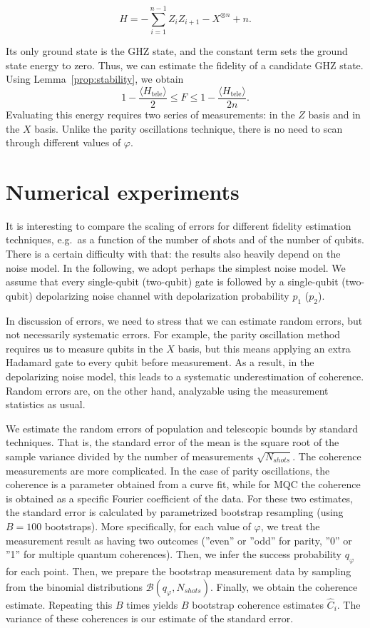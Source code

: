 \begin{equation}
    H = -\sum_{i=1}^{n-1} Z_i Z_{i+1} - X^{\otimes n} + n.
\end{equation}

Its only ground state is the GHZ state, and the constant term sets the ground state energy to zero. Thus, we can estimate the fidelity of a candidate GHZ state. Using Lemma~\ref{prop:stability}, we obtain
\begin{equation}
    1 - \frac{\langle H_\mathrm{tele} \rangle}{2}  \leq F \leq 1 - \frac{\langle H_\mathrm{tele} \rangle}{2n}.
\end{equation}
Evaluating this energy requires two series of measurements: in the $Z$ basis and in the $X$ basis. Unlike the parity oscillations technique, there is no need to scan through different values of $\varphi$.

\section{Numerical experiments}

It is interesting to compare the scaling of errors for different fidelity estimation techniques, e.g.~as a function of the number of shots and of the number of qubits. There is a certain difficulty with that: the results also heavily depend on the noise model. In the following, we adopt perhaps the simplest noise model. We assume that every single-qubit (two-qubit) gate is followed by a single-qubit (two-qubit) depolarizing noise channel with depolarization probability $p_1$ ($p_2$).

In discussion of errors, we need to stress that we can estimate random errors, but not necessarily systematic errors. For example, the parity oscillation method requires us to measure qubits in the $X$ basis, but this means applying an extra Hadamard gate to every qubit before measurement. As a result, in the depolarizing noise model, this leads to a systematic underestimation of coherence. Random errors are, on the other hand, analyzable using the measurement statistics as usual.

We estimate the random errors of population and telescopic bounds by standard techniques. That is, the standard error of the mean is the square root of the sample variance divided by the number of measurements $\sqrt{N_{shots}}$. The coherence measurements are more complicated. In the case of parity oscillations, the coherence is a parameter obtained from a curve fit, while for MQC the coherence is obtained as a specific Fourier coefficient of the data. For these two estimates, the standard error is calculated by parametrized bootstrap resampling (using $B=100$ bootstraps). More specifically, for each value of $\varphi$, we treat the measurement result as having two outcomes (''even'' or ''odd'' for parity, ''0'' or ''1'' for multiple quantum coherences). Then, we infer the success probability $q_\varphi$ for each point. Then, we prepare the bootstrap measurement data by sampling from the binomial distributions $\mathcal{B}(q_\varphi, N_{shots})$. Finally, we obtain the coherence estimate. Repeating this $B$ times yields $B$ bootstrap coherence estimates $\hat{C}_i$. The variance of these coherences is our estimate of the standard error.

